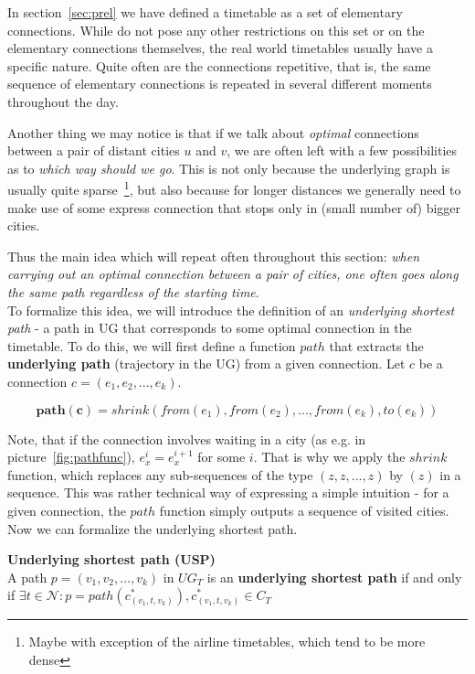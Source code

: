 In section~\ref{sec:prel} we have defined a timetable as a set of elementary connections. While do not pose any other restrictions on this set or on the elementary connections themselves, the real world timetables usually have a specific nature. Quite often are the connections repetitive, that is, the same sequence of elementary connections is repeated in several different moments throughout the day.

Another thing we may notice is that if we talk about \textit{optimal} connections between a pair of distant cities $u$ and $v$, we are often left with a few possibilities as to \textit{which way should we go}. This is not only because the underlying graph is usually quite sparse~\footnote{Maybe with exception of the airline timetables, which tend to be more dense}, but also because for longer distances we generally need to make use of some express connection that stops only in (small number of) bigger cities.

Thus the main idea which will repeat often throughout this section: \textit{when carrying out an optimal connection between a pair of cities, one often goes along the same path regardless of the starting time}. \\

\noindent To formalize this idea, we will introduce the definition of an \textit{underlying shortest path} - a path in UG that corresponds to some optimal connection in the timetable. To do this, we will first define a function $path$ that extracts the \textbf{underlying path} (trajectory in the UG) from a given connection. Let $c$ be a connection $c = (e_{1}, e_{2}, ..., e_{k})$.

\begin{equation*}
	\bm{path(c)} = shrink(from(e_{1}), from(e_{2}), ..., from(e_{k}), to(e_{k}))
\end{equation*}

\noindent Note, that if the connection involves waiting in a city (as e.g. in picture~\ref{fig:pathfunc}), $e_{x}^{i} = e_{x}^{i + 1}$ for some $i$. That is why we apply the $shrink$ function, which replaces any sub-sequences of the type $(z, z, ..., z)$ by $(z)$ in a sequence. This was rather technical way of expressing a simple intuition - for a given connection, the $path$ function simply outputs a sequence of visited cities. Now we can formalize the underlying shortest path.

\begin{definition}
        \textbf{Underlying shortest path (USP)} \\
	A path $p = (v_{1}, v_{2}, ..., v_{k})$ in $UG_{T}$ is an \textbf{underlying shortest path} if and only if $\exists t \in \mathcal{N}: p = path(c_{(v_{1}, t, v_{k})}^{*}), c_{(v_{1}, t, v_{k})}^{*} \in C_{T}$
    \end{definition}
    

